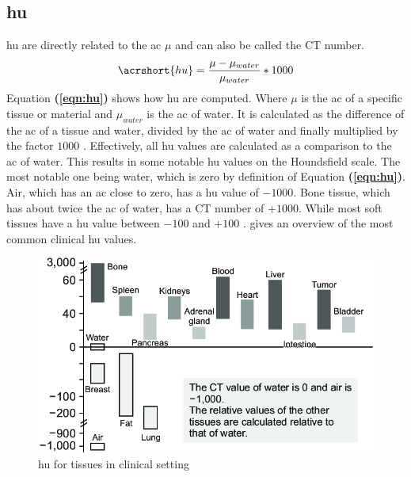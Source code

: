 \subsection{\acrfull{hu}}\label{s:b-hu}
\acrfull{hu} are directly related to the \acrfull{ac} $\mu$
and can also be called the CT number.
\begin{equation}\label{eqn:hu}
	\acrshort{hu} = \frac{\mu - \mu_{water}}{\mu_{water}}*1000
\end{equation}
\noindent
Equation \textbf{(\ref{eqn:hu})} shows how \acrshort{hu} are computed.
Where $\mu$ is the \acrlong{ac} of a specific tissue or material and $\mu_{water}$
is the \acrlong{ac} of water.
It is calculated as the difference of the \acrlong{ac} of a tissue and water,
divided by the \acrshort{ac} of water and finally multiplied by the factor $1000$ \cite{liMicrocomputedTomographySmall2008}.
Effectively, all \acrshort{hu} values are calculated as a comparison to the \acrlong{ac} of water.
This results in some notable \acrshort{hu} values on the Houndsfield scale.
The most notable one being water, which is zero by definition of Equation \textbf{(\ref{eqn:hu})}.
Air, which has an \acrlong{ac} close to zero, has a \acrshort{hu} value of $-1000$.
Bone tissue, which has about twice the \acrlong{ac} of water, has a CT number of $+1000$.
While most soft tissues have a \acrshort{hu} value between $-100$ and $+100$ \cite{liMicrocomputedTomographySmall2008}.
 gives an overview of the most common clinical \acrshort{hu} values.
\begin{figure}[h]
	\centerline{
		\includegraphics[scale=0.5]{images/huScale.png}}
	\caption{\acrshort{hu} for tissues in clinical setting \cite{jungBasicPhysicalPrinciples2021}}\label{fig:hu-scale}
\end{figure}


